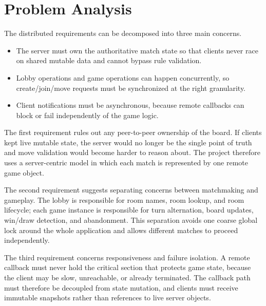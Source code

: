 \clearpage
\section{Problem Analysis}

The distributed requirements can be decomposed into three main concerns.
\begin{itemize}
    \item The server must own the authoritative match state so that clients
    never race on shared mutable data and cannot bypass rule validation.
    \item Lobby operations and game operations can happen concurrently, so
    create/join/move requests must be synchronized at the right granularity.
    \item Client notifications must be asynchronous, because remote callbacks
    can block or fail independently of the game logic.
\end{itemize}

The first requirement rules out any peer-to-peer ownership of the board. If
clients kept live mutable state, the server would no longer be the single point
of truth and move validation would become harder to reason about. The project
therefore uses a server-centric model in which each match is represented by one
remote game object.

The second requirement suggests separating concerns between matchmaking and
gameplay. The lobby is responsible for room names, room lookup, and room
lifecycle; each game instance is responsible for turn alternation, board
updates, win/draw detection, and abandonment. This separation avoids one coarse
global lock around the whole application and allows different matches to
proceed independently.

The third requirement concerns responsiveness and failure isolation. A remote
callback must never hold the critical section that protects game state, because
the client may be slow, unreachable, or already terminated. The callback path
must therefore be decoupled from state mutation, and clients must receive
immutable snapshots rather than references to live server objects.
